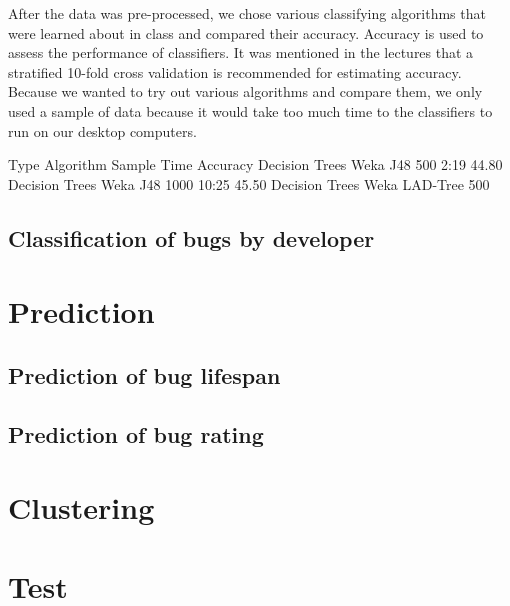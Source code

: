 After the data was pre-processed, we chose various classifying algorithms that were learned about in class and compared their accuracy. Accuracy is used to assess the performance of classifiers. It was mentioned in the lectures that a stratified 10-fold cross validation is recommended for estimating accuracy. Because we wanted to try out various algorithms and compare them, we only used a sample of data because it would take too much time to the classifiers to run on our desktop computers.

Type             Algorithm     Sample    Time    Accuracy
Decision Trees   Weka J48       500      2:19      44.80%
Decision Trees   Weka J48      1000     10:25      45.50%
Decision Trees   Weka LAD-Tree  500       


\subsection{Classification of bugs by developer} %
\label{sub:Classification of bugs bugs by developer}


\section{Prediction} %
\label{sub:Prediction}

\subsection{Prediction of bug lifespan} %
\label{sub:Prediction of bug lifespan}

\subsection{Prediction of bug rating} %
\label{sub:Prediction of bug rating}


\section{Clustering} %
\label{sub:Clustering}

\section{Test} %
\label{sec:Test}

